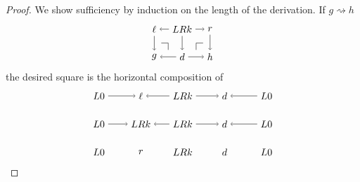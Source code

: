 \documentclass{amsart}
\newcommand{\dderiv}[2]{#1 \rightsquigarrow #2}
\theoremstyle{remark}
\theoremstyle{definition}
\begin{document}
\begin{proof}
  We show sufficiency by induction on the length of the
  derivation. If $ \dderiv{g}{h} $
  \[
  \begin{tikzpicture}
    \node (1t) at (0,1) {$ \ell $};
    \node (2t) at (1,1) {$ LRk $};
    \node (3t) at (2,1) {$ r $};
    \node (1b) at (0,0) {$ g $};
    \node (2b) at (1,0) {$ d $};
    \node (3b) at (2,0) {$ h $};
    \draw [->] (2t) to node [] {\scriptsize{$  $}} (1t);
    \draw [->] (2t) to node [] {\scriptsize{$  $}} (3t);
    \draw [->] (2b) to node [] {\scriptsize{$  $}} (1b);
    \draw [->] (2b) to node [] {\scriptsize{$  $}} (3b);
    \draw [->] (1t) to node [] {\scriptsize{$  $}} (1b);
    \draw [->] (2t) to node [] {\scriptsize{$  $}} (2b);
    \draw [->] (3t) to node [] {\scriptsize{$  $}} (3b);
       \begin{scope}[shift={(0,0)}]
        \draw [-] (0.25,0.5) to node [] {} (0.5,0.5);
        \draw [-] (0.5,0.5) to node [] {} (0.5,0.25);
      \end{scope}
      \begin{scope}[shift={(1.5,0)}]
        \draw [-] (0,0.25) to (0,0.5);
        \draw [-] (0,0.5) to (0.25,0.5);
      \end{scope}
  \end{tikzpicture}
  \]
  the desired square is the horizontal composition of
  \[
    \begin{tikzpicture}
    \begin{scope}
      \node (1t) at (0,2) {$ L0 $};
      \node (2t) at (1.5,2) {$ \ell $};
      \node (3t) at (3,2) {$ LRk $};
      \node (4t) at (4.5,2) {$ d $};
      \node (5t) at (6,2) {$ L0 $};
      \node (1m) at (0,1) {$ L 0 $};
      \node (2m) at (1.5,1) {$ LRk $};
      \node (3m) at (3,1) {$ LRk $};
      \node (4m) at (4.5,1) {$ d $};
      \node (5m) at (6,1) {$ L 0 $};
      \node (1b) at (0,0) {$ L 0 $};
      \node (2b) at (1.5,0) {$ r $};
      \node (3b) at (3,0) {$ LRk $};
      \node (4b) at (4.5,0) {$ d $};
      \node (5b) at (6,0) {$ L 0 $};
      \draw [->] (1t) to node [] {\scriptsize{$  $}} (2t);
      \draw [->] (3t) to node [] {\scriptsize{$  $}} (2t);
      \draw [->] (3t) to node [] {\scriptsize{$  $}} (4t);
      \draw [->] (5t) to node [] {\scriptsize{$  $}} (4t);
      \draw [->] (1m) to node [] {\scriptsize{$  $}} (2m);
      \draw [->] (3m) to node [] {\scriptsize{$  $}} (2m);
      \draw [->] (3m) to node [] {\scriptsize{$  $}} (4m);
      \draw [->] (5m) to node [] {\scriptsize{$  $}} (4m);

\end{scope}
\end{tikzpicture}\]
\end{proof}
\end{document}
